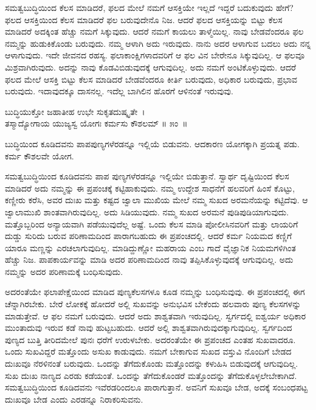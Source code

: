ಸಮತ್ವಬುದ್ಧಿಯಿಂದ ಕೆಲಸ ಮಾಡಿದರೆ, ಫಲದ ಮೇಲೆ ನಮಗೆ ಆಸಕ್ತಿಯೇ ಇಲ್ಲದೆ ಇದ್ದರೆ ಬದುಕುವುದು ಹೇಗೆ? ಫಲದ ಆಸಕ್ತಿಯಿಂದ ಕೆಲಸ ಮಾಡಿದರೆ ಫಲ ಬರುವುದೇನೊ ನಿಜ. ಆದರೆ ಫಲದ ಆಸಕ್ತಿಯನ್ನು ಬಿಟ್ಟು ಕೆಲಸ ಮಾಡಿದರೆ ಅದಕ್ಕಿಂತ ಹೆಚ್ಚು ನಮಗೆ ಸಿಕ್ಕುವುದು. ಆದರೆ ನಮಗೆ ಕಾಯಲು ತಾಳ್ಮೆಯಿಲ್ಲ. ನಾವು ಬೇಡವೆಂದರೂ ಫಲ ನಮ್ಮನ್ನು ಹುಡುಕಿಕೊಂಡು ಬರುವುದು. ನಮ್ಮ ಆಳಾಗಿ ಅದು ಇರುವುದು. ನಾನು ಅದರ ಆಳಾಗುವ ಬದಲು ಅದು ನನ್ನ ಆಳಾಗುವುದು. ಇದೇ ಜೀವನದ ರಹಸ್ಯ. ಫಲಾಕಾಂಕ್ಷಿಗಳಾದವರಿಗೆ ಆ ಫಲ ವಿನ ಬೇರೇನೂ ಸಿಕ್ಕುವುದಿಲ್ಲ. ಆ ಫಲವೂ ಮಿಶ್ರವಾಗಿರುವುದು. ಅದನ್ನು ನಾವು ಕೊಡವಿಬಿಡುವುದಕ್ಕೆ ಆಗುವುದಿಲ್ಲ. ಅದು ನಮಗೆ ಅಂಟಿಕೊಳ್ಳುವುದು. ಆದರೆ ಫಲದ ಮೇಲೆ ಆಸಕ್ತಿ ಬಿಟ್ಟು ಕೆಲಸ ಮಾಡಿದರೆ ಬೇಡವೆಂದರೂ ಕೀರ್ತಿ ಬರುವುದು, ಅಧಿಕಾರ ಬರುವುದು, ಪ್ರಭಾವ ಬರುವುದು. ಇದಾವುದಕ್ಕೂ ದಾಸನಲ್ಲ. ಇದೆಲ್ಲ ಬಾಗಿಲಿನ ಹೊರಗೆ ಆಳಿನಂತೆ ಇರುವುವು.

\begin{shloka}
ಬುದ್ಧಿಯುಕ್ತೋ ಜಹಾತೀಹ ಉಭೇ ಸುಕೃತದುಷ್ಕೃತೇ~।\\ತಸ್ಮಾದ್ಯೋಗಾಯ ಯುಜ್ಯಸ್ವ ಯೋಗಃ ಕರ್ಮಸು ಕೌಶಲಮ್ \hfill॥ ೫ಂ~॥
\end{shloka}

\begin{artha}
ಬುದ್ಧಿಯಿಂದ ಕೂಡಿದವನು ಪಾಪಪುಣ್ಯಗಳೆರಡನ್ನೂ ಇಲ್ಲಿಯೆ ಬಿಡುವನು. ಆದಕಾರಣ ಯೋಗಕ್ಕಾಗಿ ಪ್ರಯತ್ನ ಪಡು. ಕರ್ಮ ಕೌಶಲವೇ ಯೋಗ.
\end{artha}

ಸಮತ್ವಬುದ್ಧಿಯಿಂದ ಕೂಡಿದವನು ಪಾಪ ಪುಣ್ಯಗಳೆರಡನ್ನೂ ಇಲ್ಲಿಯೇ ಬಿಡುತ್ತಾನೆ. ಸ್ವಾರ್ಥ ದೃಷ್ಟಿಯಿಂದ ಕೆಲಸ ಮಾಡಿದರೆ ಅದು ನಮ್ಮನ್ನು ಈ ಪ್ರಪಂಚಕ್ಕೆ ಕಟ್ಟಿಹಾಕುವುದು. ನಮ್ಮ ಉದ್ದೇಶ ಸಾಧನೆಗೆ ಹಲವರಿಗೆ ಹಿಂಸೆ ಕೊಟ್ಟು, ಕಣ್ಣೀರು ಕರೆಸಿ, ಅವರ ದುಃಖ ಮತ್ತು ಕಷ್ಟದ ಜ್ವಾಲಾ ಮುಖಿಯ ಮೇಲೆ ನಮ್ಮ ಸುಖದ ಅರಮನೆಯನ್ನು ಕಟ್ಟಿದೆವು. ಆ ಜ್ವಾಲಾಮುಖಿ ಶಾಂತವಾಗಿರುವುದಿಲ್ಲ. ಅದು ಸಿಡಿಯುವುದು. ನಮ್ಮ ಸುಖದ ಅರಮನೆ ಪುಡಿಪುಡಿಯಾಗುವುದು. ಮತ್ತೊಬ್ಬರಿಂದ ಅನ್ಯಾಯವಾಗಿ ಪಡೆಯುವುದೆಲ್ಲ ಅಷ್ಟೆ. ಒಂದು ಕೆಲಸ ಮಾಡಿ ಪೋಲೀಸಿನವರಿಗೆ ಮತ್ತು ಲಾಯರಿಗೆ ದುಡ್ಡು ಸುರಿದು ಬರುವ ಪರಿಣಾಮದಿಂದ ಪಾರಾಗಬಹುದು ಈ ಪ್ರಪಂಚದಲ್ಲಿ. ಆದರೆ ಕರ್ಮ ನಿಯಮದ ಕಣ್ಣಿಗೆ ಯಾರೂ ಮಣ್ಣನ್ನು ಎರಚಲಾಗುವುದಿಲ್ಲ. ಮಾಡಿದ್ದುಣ್ಣೋ ಮಹರಾಯ ಎಂಬ ಗಾದೆ ವೈಜ್ಞಾನಿಕ ನಿಯಮಗಳಿಗಿಂತ ಹೆಚ್ಚು ನಿಜ. ಪಾಪಕಾರ್ಯವನ್ನು ಮಾಡಿ ಅದರ ಪರಿಣಾಮದಿಂದ ನಾವು ತಪ್ಪಿಸಿಕೊಳ್ಳುವುದಕ್ಕೆ ಆಗುವುದಿಲ್ಲ. ಅದು ನಮ್ಮನ್ನು ಅದರ ಪರಿಣಾಮಕ್ಕೆ ಬಂಧಿಸುವುದು.

ಅದರಂತೆಯೇ ಫಲಾಪೇಕ್ಷೆಯಿಂದ ಮಾಡಿದ ಪುಣ್ಯಕೆಲಸಗಳೂ ಕೂಡ ನಮ್ಮನ್ನು ಬಂಧಿಸುವುವು. ಈ ಪ್ರಪಂಚದಲ್ಲಿ ಈಗ ಚೆನ್ನಾಗಿರಬೇಕು. ಬೇರೆ ಲೋಕಕ್ಕೆ ಹೋದರೆ ಅಲ್ಲಿ ಸುಖವನ್ನು ಅನುಭವಿಸ ಬೇಕೆಂದು ಹಲವಾರು ಪುಣ್ಯ ಕೆಲಸಗಳನ್ನು ಮಾಡುತ್ತೇವೆ. ಆ ಫಲ ನಮಗೆ ಬರುವುದು. ಆದರೆ ಅದು ಶಾಶ್ವತವಾಗಿ ಇರುವುದಿಲ್ಲ. ಸ್ವರ್ಗದಲ್ಲಿ ಐಶ್ವರ್ಯ ಅಧಿಕಾರ ಮುಂತಾದುವು ಇರುವ ಕಡೆ ನಾವು ಹುಟ್ಟಬಹುದು. ಆದರೆ ಅಲ್ಲಿ ಶಾಶ್ವತವಾಗಿರುವುದಕ್ಕಾಗುವುದಿಲ್ಲ. ಸ್ವರ್ಗದಿಂದ ಪುಣ್ಯದ ಬುತ್ತಿ ತೀರಿದಮೇಲೆ ಪುನಃ ಧರೆಗೆ ಉರುಳಬೇಕು. ಅದರಂತೆಯೇ ಈ ಪ್ರಪಂಚದ ಎಂತಹ ಸುಖವಾದರೂ. ಒಂದು ಸುಖವಿದ್ದರೆ ಮತ್ತೊಂದು ಅಸುಖ ಕಾಡುವುದು. ನಮಗೆ ಬೇಕಾಗುವ ಸುಖದ ವಸ್ತುವಿ ನೊಂದಿಗೆ ಬೇಡದ ದುಃಖವೂ ನೆರಳಿನಂತೆ ಬರುವುದು. ಒಂದನ್ನು ತೆಗೆದುಕೊಂಡು ಮತ್ತೊಂದನ್ನು ಕಳುಹಿಸಿ ಬಿಡುವುದಕ್ಕೆ ಆಗುವುದಿಲ್ಲ. ಸುಖ ದುಃಖ ನಾಣ್ಯದ ಎರಡು ಕಡೆಯಂತೆ. ಒಂದನ್ನು ತೆಗೆದುಕೊಂಡರೆ ಮತ್ತೊಂದನ್ನು ತೆಗೆದುಕೊಳ್ಳಲೇಬೇಕಾಗಿದೆ. ಸಮತ್ವಬುದ್ಧಿಯಿಂದ ಕೂಡಿದವನು ಇವೆರಡರಿಂದಲೂ ಪಾರಾಗುತ್ತಾನೆ. ಅವನಿಗೆ ಸುಖವೂ ಬೇಡ, ಅದಕ್ಕೆ ಸಂಬಂಧಪಟ್ಟ ದುಃಖವೂ ಬೇಡ ಎಂದು ಎರಡನ್ನೂ ನಿರಾಕರಿಸುವನು.

